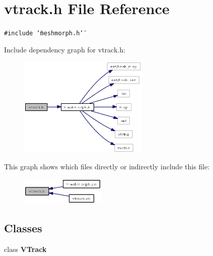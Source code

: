 \section{vtrack.h File Reference}
\label{vtrack_8h}
{\tt \#include \char`\"{}meshmorph.h\char`\"{}}\par


Include dependency graph for vtrack.h:\begin{figure}[H]
\begin{center}
\leavevmode
\includegraphics[width=175pt]{vtrack_8h__incl}
\end{center}
\end{figure}


This graph shows which files directly or indirectly include this file:\begin{figure}[H]
\begin{center}
\leavevmode
\includegraphics[width=115pt]{vtrack_8h__dep__incl}
\end{center}
\end{figure}
\subsection*{Classes}
\begin{CompactItemize}
\item 
class {\bf VTrack}
\end{CompactItemize}

